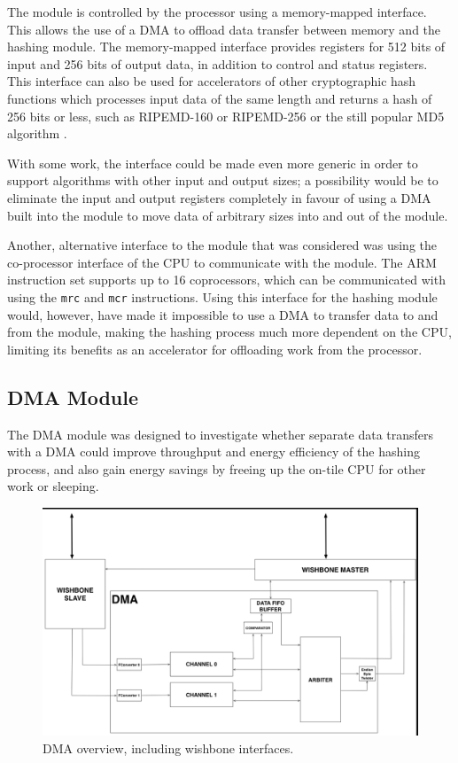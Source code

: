 The module is controlled by the processor using a memory-mapped interface. This allows the use
of a DMA to offload data transfer between memory and the hashing module. The memory-mapped interface
provides registers for 512 bits of input and 256 bits of output data, in addition to control and
status registers. This interface can also be used for accelerators of other cryptographic hash
functions which processes input data of the same length and returns a hash of 256 bits or less,
such as RIPEMD-160 or RIPEMD-256 \cite{ripemd} or the still popular MD5 algorithm \cite{md5}.

With some work, the interface could be made even more generic in order to support algorithms
with other input and output sizes; a possibility would be to eliminate the input and output
registers completely in favour of using a DMA built into the module to move data of arbitrary
sizes into and out of the module.

Another, alternative interface to the module that was considered was using the co-processor interface
of the CPU to communicate with the module. The ARM instruction set supports up to 16 coprocessors,
which can be communicated with using the \texttt{mrc} and \texttt{mcr} instructions. Using this
interface for the hashing module would, however, have made it impossible to use a DMA to transfer
data to and from the module, making the hashing process much more dependent on the CPU, limiting
its benefits as an accelerator for offloading work from the processor.


\subsection{DMA Module}

The DMA module was designed to investigate whether separate data transfers with a DMA could improve throughput and energy efficiency of the hashing process, and also gain energy savings by freeing up the on-tile CPU for other work or sleeping.

\begin{figure}[htb]
    \centering
    \includegraphics[width=1.0\textwidth]{Figures/DMA/DMATopview}
    \caption{DMA overview, including wishbone interfaces.}
    \label{fig:DMATop}
\end{figure}

